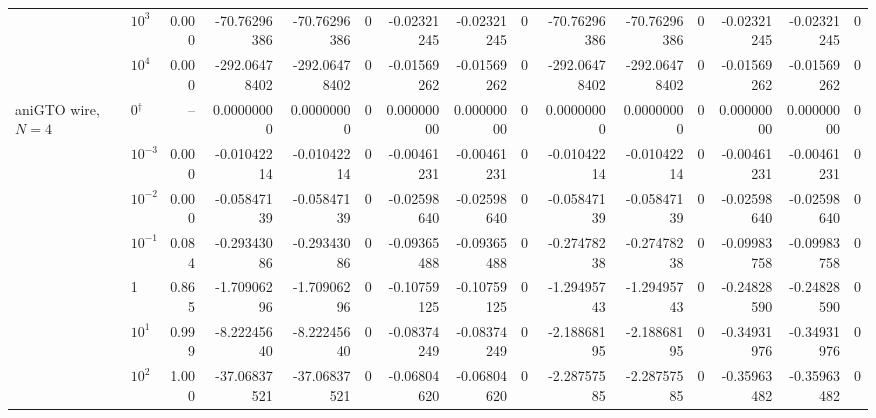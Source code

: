 \begin{tabular}{@{}llr rrr rrr rrr rrr@{}}
 & $10^{3}$ & 0.000 & -70.76296386 & -70.76296386 & \textcolor{green!50!black}{0} & -0.02321245 & -0.02321245 & \textcolor{green!50!black}{0} & -70.76296386 & -70.76296386 & \textcolor{green!50!black}{0} & -0.02321245 & -0.02321245 & \textcolor{green!50!black}{0} \\
 & $10^{4}$ & 0.000 & -292.06478402 & -292.06478402 & \textcolor{green!50!black}{0} & -0.01569262 & -0.01569262 & \textcolor{green!50!black}{0} & -292.06478402 & -292.06478402 & \textcolor{green!50!black}{0} & -0.01569262 & -0.01569262 & \textcolor{green!50!black}{0} \\
\addlinespace
aniGTO wire, $N=4$ & 0$^{\dagger}$ & -- & 0.00000000 & 0.00000000 & \textcolor{green!50!black}{0} & 0.00000000 & 0.00000000 & \textcolor{green!50!black}{0} & 0.00000000 & 0.00000000 & \textcolor{green!50!black}{0} & 0.00000000 & 0.00000000 & \textcolor{green!50!black}{0} \\
 & $10^{-3}$ & 0.000 & -0.01042214 & -0.01042214 & \textcolor{green!50!black}{0} & -0.00461231 & -0.00461231 & \textcolor{green!50!black}{0} & -0.01042214 & -0.01042214 & \textcolor{green!50!black}{0} & -0.00461231 & -0.00461231 & \textcolor{green!50!black}{0} \\
 & $10^{-2}$ & 0.000 & -0.05847139 & -0.05847139 & \textcolor{green!50!black}{0} & -0.02598640 & -0.02598640 & \textcolor{green!50!black}{0} & -0.05847139 & -0.05847139 & \textcolor{green!50!black}{0} & -0.02598640 & -0.02598640 & \textcolor{green!50!black}{0} \\
 & $10^{-1}$ & 0.084 & -0.29343086 & -0.29343086 & \textcolor{green!50!black}{0} & -0.09365488 & -0.09365488 & \textcolor{green!50!black}{0} & -0.27478238 & -0.27478238 & \textcolor{green!50!black}{0} & -0.09983758 & -0.09983758 & \textcolor{green!50!black}{0} \\
 & 1 & 0.865 & -1.70906296 & -1.70906296 & \textcolor{green!50!black}{0} & -0.10759125 & -0.10759125 & \textcolor{green!50!black}{0} & -1.29495743 & -1.29495743 & \textcolor{green!50!black}{0} & -0.24828590 & -0.24828590 & \textcolor{green!50!black}{0} \\
 & $10^{1}$ & 0.999 & -8.22245640 & -8.22245640 & \textcolor{green!50!black}{0} & -0.08374249 & -0.08374249 & \textcolor{green!50!black}{0} & -2.18868195 & -2.18868195 & \textcolor{green!50!black}{0} & -0.34931976 & -0.34931976 & \textcolor{green!50!black}{0} \\
 & $10^{2}$ & 1.000 & -37.06837521 & -37.06837521 & \textcolor{green!50!black}{0} & -0.06804620 & -0.06804620 & \textcolor{green!50!black}{0} & -2.28757585 & -2.28757585 & \textcolor{green!50!black}{0} & -0.35963482 & -0.35963482 & \textcolor{green!50!black}{0} \\

\end{tabular}
